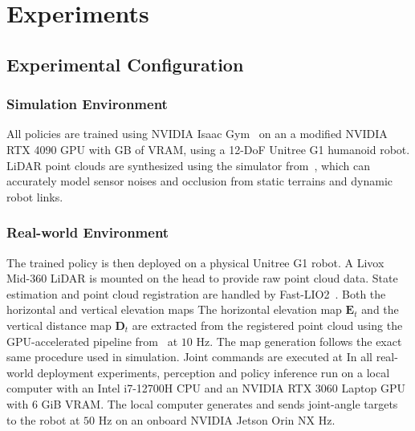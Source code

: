 \documentclass[letterpaper, 10 pt, conference]{ieeeconf/ieeeconf}
\providecommand{\DIFadd}[1]{{\protect\color{blue} \sf #1}} %
\providecommand{\DIFdel}[1]{{\protect\color{red} \scriptsize #1}} %
\providecommand{\DIFaddbegin}{} %
\providecommand{\DIFaddend}{} %
\providecommand{\DIFdelbegin}{} %
\providecommand{\DIFdelend}{} %
\begin{document}
\DIFaddend %
\DIFaddbegin 

\DIFaddend %
\section{Experiments}
\label{sec:experiment}

\subsection{Experimental Configuration}
\label{sec:method_terrain}

\subsubsection{Simulation Environment} All policies are trained using NVIDIA Isaac Gym~\cite{Isaac_Gym} on \DIFdelbegin \DIFdel{an }\DIFdelend \DIFaddbegin \DIFadd{a modified }\DIFaddend NVIDIA RTX 4090 GPU with \DIFaddbegin \DIFadd{48 GB of VRAM, using }\DIFaddend a 12-DoF Unitree G1 humanoid robot. LiDAR point clouds are synthesized using the simulator from~\cite{Wang_2025_Omni-Perception}, which can accurately model sensor noises and occlusion from static terrains and dynamic robot links.

\subsubsection{Real-world Environment} The trained policy is then deployed on a physical Unitree G1 robot. A Livox Mid-360 LiDAR is mounted on the head to provide raw point cloud data. State estimation and point cloud registration are handled by Fast-LIO2~\cite{Xu_2022_FAST-LIO2}. \DIFdelbegin \DIFdel{Both the horizontal and vertical elevation maps }\DIFdelend \DIFaddbegin \DIFadd{The horizontal elevation map }\DIFaddend $\mathbf{E}_t$ \DIFaddbegin \DIFadd{and the vertical distance map $\mathbf{D}_t$ }\DIFaddend are extracted from the registered point cloud using the GPU-accelerated pipeline from~\cite{ElevationMap_GPU_2022} at $10$ Hz. 
The map generation follows the exact same procedure used in simulation. \DIFdelbegin \DIFdel{Joint commands are executed at }\DIFdelend \DIFaddbegin \DIFadd{In all real-world deployment experiments, perception and policy inference run on a local computer with an Intel i7-12700H CPU and an NVIDIA RTX 3060 Laptop GPU with 6 GiB VRAM. The local computer generates and sends joint-angle targets to the robot at }\DIFaddend $50$ \DIFdelbegin \DIFdel{Hz on an onboard NVIDIA Jetson Orin NX}\DIFdelend \DIFaddbegin \DIFadd{Hz}\DIFaddend .
\end{document}
